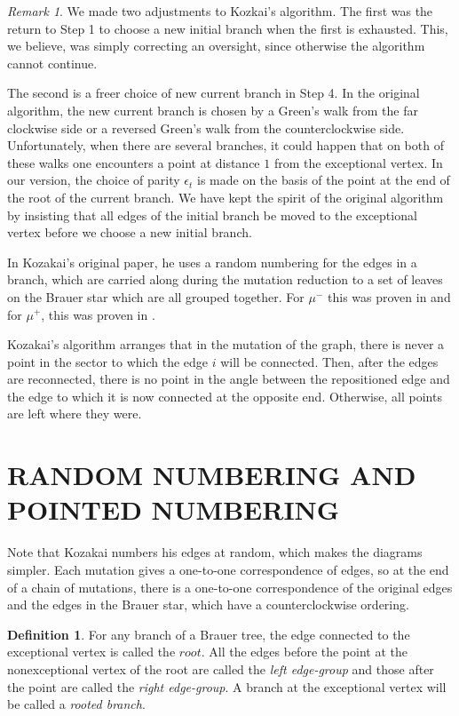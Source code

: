 \documentclass[11pt,english]{article}
\numberwithin{figure}{section}
\numberwithin{equation}{section}
\numberwithin{table}{section}
\theoremstyle{definition}
\newtheorem{defn}{Definition}[section]
\theoremstyle{remark}
\newtheorem{remark}{Remark}[section]
\begin{document}
	\begin{remark}
		We made two adjustments to Kozkai's algorithm. The first was the return to Step 1 to choose a new initial branch when the first is exhausted.  This, we believe, was simply correcting an oversight, since otherwise the algorithm cannot continue.
		
		The second is a freer choice of new current branch in Step 4.  In the original algorithm, the new current branch is chosen by a Green's walk from the far clockwise side or a reversed Green's walk from the  counterclockwise side.  Unfortunately, when there are several branches, it could happen that on both of these walks one encounters a point at distance $1$ from the exceptional vertex.  In our version, the choice of parity $\epsilon_t$ is made on the basis of the point at the end of the root of the current branch. We have kept the spirit of the original algorithm by insisting that all edges of the initial branch be moved to the exceptional vertex before we choose a new initial branch.
	\end{remark}
	
	In Kozakai's original paper, he uses a random numbering for the edges in a branch, which are carried along during the mutation reduction to a set of leaves on the Brauer star which are all grouped together.  For $\mu^-$ this was proven in \cite{SZv} and for $\mu^+$, this was proven in \cite{Z2}.

Kozakai's algorithm arranges that in the mutation of the graph, there is never a point in the sector to which the edge 
$i$ will be connected.  Then, after the edges are reconnected, there is no point in the angle between the repositioned  edge and the edge to which it is now connected at the opposite end.  Otherwise, all points are left where they were.


\section{RANDOM NUMBERING AND POINTED NUMBERING}

Note that Kozakai numbers his edges at random, which makes the diagrams simpler.  Each mutation gives a one-to-one correspondence of edges, so at the end of a chain of mutations, there is a one-to-one correspondence of the original edges and the edges in the Brauer star, which have a counterclockwise ordering. 


\begin{defn}
	For any branch of a Brauer tree, the edge connected to the exceptional vertex is called the $\textit{root}$.  All the edges before the point at the nonexceptional vertex of the root are called the \textit{left edge-group} and those after the point are called the \textit{right edge-group}.
	A branch at the exceptional vertex will be called a \textit{rooted branch}.
\end{defn}
\end{document}
